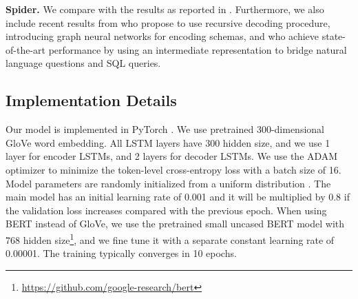 \documentclass[11pt,a4paper]{article}
\begin{document}
\textbf{Spider.}
We compare with the results as reported in .
Furthermore, we also include recent results from  who propose to use recursive decoding procedure,  introducing graph neural networks for encoding schemas, and  who achieve state-of-the-art performance by using an intermediate representation to bridge natural language questions and SQL queries.

\subsection{Implementation Details}
Our model is implemented in PyTorch \cite{paszke2017automatic}.
We use pretrained 300-dimensional GloVe \cite{pennington2014glove} word embedding.
All LSTM layers have 300 hidden size, and we use 1 layer for encoder LSTMs, and 2 layers for decoder LSTMs.
We use the ADAM optimizer \cite{kingma2015adam} to minimize the token-level cross-entropy loss with a batch size of 16.
Model parameters are randomly initialized from a uniform distribution .
The main model has an initial learning rate of 0.001 and it will be multiplied by 0.8 if the validation loss increases compared with the previous epoch.
When using BERT instead of GloVe, we use the pretrained small uncased BERT model with 768 hidden size\footnote{\scriptsize \url{https://github.com/google-research/bert}}, and we fine tune it with a separate constant learning rate of 0.00001.
The training typically converges in 10 epochs.

\begin{table}[t!]
\caption{Spider results on dev set and test set.
}
\vspace{-3mm}
\label{tab:spider_result}
\end{table}
\end{document}
